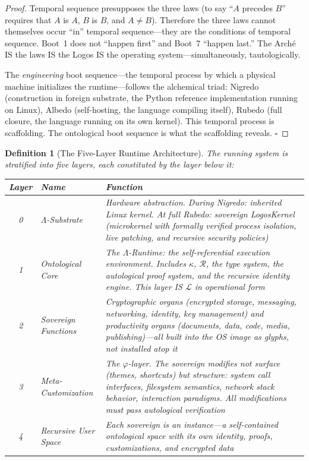 \documentclass[12pt, letterpaper]{book}
\newtheorem{definition}{Definition}[chapter]
\begin{document}
\begin{proof}
Temporal sequence presupposes the three laws (to say ``$A$ precedes $B$'' requires that $A$ is $A$, $B$ is $B$, and $A \neq B$). Therefore the three laws cannot themselves occur ``in'' temporal sequence---they are the conditions of temporal sequence. Boot~1 does not ``happen first'' and Boot~7 ``happen last.'' The Arch\'{e} IS the laws IS the Logos IS the operating system---simultaneously, tautologically.

The \textit{engineering} boot sequence---the temporal process by which a physical machine initializes the runtime---follows the alchemical triad: Nigredo (construction in foreign substrate, the Python reference implementation running on Linux), Albedo (self-hosting, the language compiling itself), Rubedo (full closure, the language running on its own kernel). This temporal process is scaffolding. The ontological boot sequence is what the scaffolding reveals. $\square$
\end{proof}

\begin{definition}[The Five-Layer Runtime Architecture]\label{def:runtime-layers}
The running system is stratified into five layers, each constituted by the layer below it:
\begin{center}
\small
\renewcommand{\arraystretch}{1.3}
\begin{tabular}{clp{7cm}}
\toprule
\textbf{Layer} & \textbf{Name} & \textbf{Function} \\
\midrule
0 & $\Lambda$-Substrate & Hardware abstraction. During Nigredo: inherited Linux kernel. At full Rubedo: sovereign LogosKernel (microkernel with formally verified process isolation, live patching, and recursive security policies) \\
\midrule
1 & Ontological Core & The $\Lambda$-Runtime: the self-referential execution environment. Includes $\kappa$, $\mathcal{R}$, the type system, the autological proof system, and the recursive identity engine. This layer IS $\mathcal{L}$ in operational form \\
\midrule
2 & Sovereign Functions & Cryptographic organs (encrypted storage, messaging, networking, identity, key management) and productivity organs (documents, data, code, media, publishing)---all built \textit{into} the OS image as glyphs, not installed atop it \\
\midrule
3 & Meta-Customization & The $\varphi$-layer. The sovereign modifies not surface (themes, shortcuts) but \textit{structure}: system call interfaces, filesystem semantics, network stack behavior, interaction paradigms. All modifications must pass autological verification \\
\midrule
4 & Recursive User Space & Each sovereign is an instance---a self-contained ontological space with its own identity, proofs, customizations, and encrypted data \\
\bottomrule
\end{tabular}
\end{center}
\end{definition}
\end{document}
